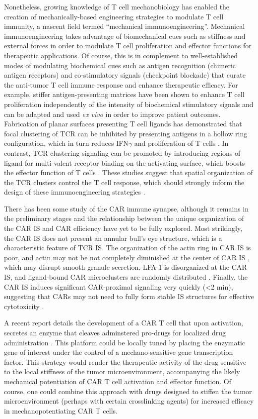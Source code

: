 Nonetheless, growing knowledge of T cell mechanobiology has enabled the creation of mechanically-based engineering strategies to modulate T cell immunity, a nascent field termed “mechanical immunoengineering”. Mechanical immunoengineering takes advantage of biomechanical cues such as stiffness and external forces in order to modulate T cell proliferation and effector functions for therapeutic applications. Of course, this is in complement to well-established modes of modulating biochemical cues such as antigen recognition (chimeric antigen receptors) and co-stimulatory signals (checkpoint blockade) that curate the anti-tumor T cell immune response and enhance therapeutic efficacy. For example, stiffer antigen-presenting matrices have been shown to enhance T cell proliferation independently of the intensity of biochemical stimulatory signals \cite{Lei2020} and can be adapted and used \textit{ex vivo} in order to improve patient outcomes. Fabrication of planar surfaces presenting T cell ligands has demonstrated that focal clustering of TCR can be inhibited by presenting antigens in a hollow ring configuration, which in turn reduces IFN$\gamma$ and proliferation of T cells \cite{Schraml2015}. In contrast, TCR clustering signaling can be promoted by introducing regions of ligand for multi-valent receptor binding on the activating surface, which boosts the effector function of T cells \cite{OConnor2012, Schraml2015}. These studies suggest that spatial organization of the TCR clusters control the T cell response, which should strongly inform the design of these immunoengineering strategies \cite{Aramesh2019}.

There has been some study of the CAR immune synapse, although it remains in the preliminary stages and the relationship between the unique organization of the CAR IS and CAR efficiency have yet to be fully explored. Most strikingly, the CAR IS does not present an annular bull's eye structure, which is a characteristic feature of TCR IS. The organization of the actin ring in CAR IS is poor, and actin may not be not completely diminished at the center of CAR IS \cite{Xiong2018}, which may disrupt smooth granule secretion. LFA-1 is disorganized at the CAR IS, and ligand-bound CAR microclusters are randomly distributed \cite{Davenport2019}. Finally, the CAR IS induces significant CAR-proximal signaling very quickly (\textless 2 min), suggesting that CARs may not need to fully form stable IS structures for effective cytotoxicity \cite{Li2020, Watanabe2018}. 

A recent report details the development of a CAR T cell that upon activation, secretes an enzyme that cleaves adminstered pro-drugs for localized drug administration \cite{Gardner2021}. This platform could be locally tuned by placing the enzymatic gene of interest under the control of a mechano-sensitive gene transcription factor. This strategy would render the therapeutic activity of the drug sensitive to the local stiffness of the tumor microenvironment, accompanying the likely mechanical potentiation of CAR T cell activation and effector function. Of course, one could combine this approach with drugs designed to stiffen the tumor microenvironment (perhaps with certain crosslinking agents) for increased efficacy in mechanopotentiating CAR T cells. 

